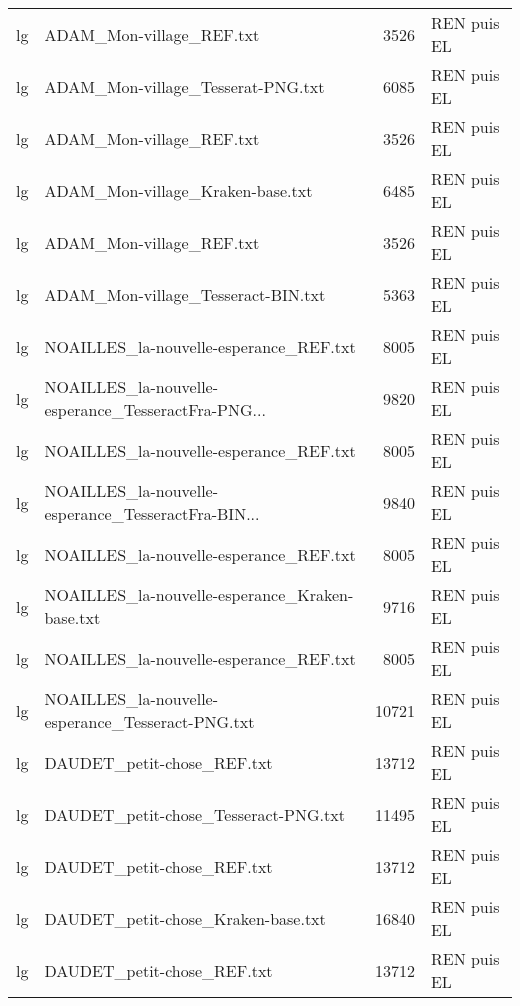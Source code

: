 \begin{tabular}{llrl}
    lg &                           ADAM\_Mon-village\_REF.txt &                  3526 & REN puis EL \\
    lg &                  ADAM\_Mon-village\_Tesserat-PNG.txt &                  6085 & REN puis EL \\
    lg &                           ADAM\_Mon-village\_REF.txt &                  3526 & REN puis EL \\
    lg &                   ADAM\_Mon-village\_Kraken-base.txt &                  6485 & REN puis EL \\
    lg &                           ADAM\_Mon-village\_REF.txt &                  3526 & REN puis EL \\
    lg &                 ADAM\_Mon-village\_Tesseract-BIN.txt &                  5363 & REN puis EL \\
    lg &             NOAILLES\_la-nouvelle-esperance\_REF.txt &                  8005 & REN puis EL \\
    lg & NOAILLES\_la-nouvelle-esperance\_TesseractFra-PNG... &                  9820 & REN puis EL \\
    lg &             NOAILLES\_la-nouvelle-esperance\_REF.txt &                  8005 & REN puis EL \\
    lg & NOAILLES\_la-nouvelle-esperance\_TesseractFra-BIN... &                  9840 & REN puis EL \\
    lg &             NOAILLES\_la-nouvelle-esperance\_REF.txt &                  8005 & REN puis EL \\
    lg &     NOAILLES\_la-nouvelle-esperance\_Kraken-base.txt &                  9716 & REN puis EL \\
    lg &             NOAILLES\_la-nouvelle-esperance\_REF.txt &                  8005 & REN puis EL \\
    lg &   NOAILLES\_la-nouvelle-esperance\_Tesseract-PNG.txt &                 10721 & REN puis EL \\
    lg &                         DAUDET\_petit-chose\_REF.txt &                 13712 & REN puis EL \\
    lg &               DAUDET\_petit-chose\_Tesseract-PNG.txt &                 11495 & REN puis EL \\
    lg &                         DAUDET\_petit-chose\_REF.txt &                 13712 & REN puis EL \\
    lg &                 DAUDET\_petit-chose\_Kraken-base.txt &                 16840 & REN puis EL \\
    lg &                         DAUDET\_petit-chose\_REF.txt &                 13712 & REN puis EL \\

\end{tabular}
